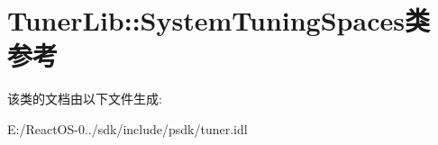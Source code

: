 \hypertarget{class_tuner_lib_1_1_system_tuning_spaces}{}\section{Tuner\+Lib\+:\+:System\+Tuning\+Spaces类 参考}
\label{class_tuner_lib_1_1_system_tuning_spaces}


该类的文档由以下文件生成\+:\begin{DoxyCompactItemize}
\item 
E\+:/\+React\+O\+S-\/0../sdk/include/psdk/tuner.\+idl\end{DoxyCompactItemize}
